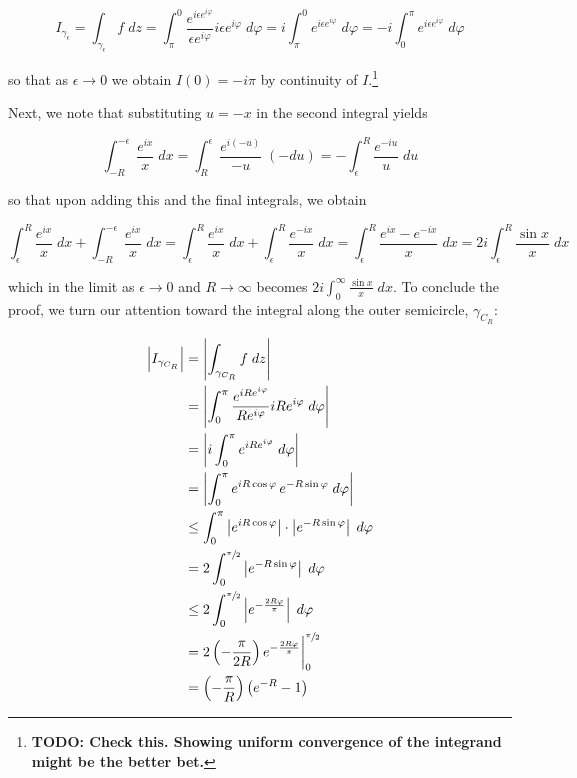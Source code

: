 \begin{solution}
    $$
    I_{\gamma_{\epsilon}} 
      = \int_{\gamma_{\epsilon}} {f \; dz } 
      = \int_{\pi}^{0} {\frac{e^{i \epsilon e^{i \varphi}}}{\epsilon e^{i \varphi}} i \epsilon e^{i \varphi} \; d\varphi }
      = i \int_{\pi}^{0} {e^{i \epsilon e^{i \varphi}} \; d\varphi }
      = -i \int_{0}^{\pi} {e^{i \epsilon e^{i \varphi}} \; d\varphi }
    $$

    so that as $\epsilon \to 0$ we obtain $I(0) = -i \pi$ by continuity of $I$.\footnote{
        \textbf{TODO: Check this. Showing uniform convergence of the integrand might be the better bet.}
    }

    \pagebreak
    Next, we note that substituting $u = -x$ in the second integral yields

    $$
    \int_{-R}^{-\epsilon} {\frac{e^{ix}}{x} \; dx} 
    = \int_{R}^{\epsilon} {\frac{e^{i(-u)}}{-u} \; (-du)}
    = -\int_{\epsilon}^{R} {\frac{e^{-iu}}{u} \; du}
    $$

    so that upon adding this and the final integrals, we obtain

    $$
    \int_{\epsilon}^{R} {\frac{e^{ix}}{x} \; dx} + \int_{-R}^{-\epsilon} {\frac{e^{ix}}{x} \; dx} 
    = \int_{\epsilon}^{R} {\frac{e^{ix}}{x} \; dx} + \int_{\epsilon}^{R} {\frac{e^{-ix}}{x} \; dx}
    = \int_{\epsilon}^{R} {\frac{e^{ix} - e^{-ix}}{x} \; dx}
    = 2i \int_{\epsilon}^{R} {\frac{\sin{x}}{x} \; dx}
    $$

    which in the limit as $\epsilon \to 0$ and $R \to \infty$ becomes $2i \int_{0}^{\infty} {\frac{\sin{x}}{x} \; dx}$.
    To conclude the proof, we turn our attention toward the integral along the outer semicircle, $\gamma_{C_R}$:

    \begin{align*}
    \left| I_{\gamma_{C_R}} \right|
      &= \left| \int_{\gamma_{C_R}} {f \; dz } \right| \\
      &= \left| \int_{0}^{\pi} {\frac{e^{i R e^{i \varphi}}}{R e^{i \varphi}} i R e^{i \varphi} \; d\varphi } \right| \\
      &= \left| i \int_{0}^{\pi} {e^{i R e^{i \varphi}} \; d\varphi } \right| \\
      &= \left| \int_{0}^{\pi} {e^{i R \cos{\varphi}} \, e^{-R \sin{\varphi}} \; d\varphi } \right| \\
      &\le \int_{0}^{\pi} {\left| e^{i R \cos{\varphi}}\right| \cdot \left| e^{-R \sin{\varphi}} \right| \; d\varphi } \\
      &=   2 \int_{0}^{\sfrac{\pi}{2}} {\left| e^{-R \sin{\varphi}} \right| \; d\varphi } \\
      &\le 2 \int_{0}^{\sfrac{\pi}{2}} {\left| e^{-\frac{2 R \varphi}{\pi} } \right| \; d\varphi } \\
      &=   2 \left( -\frac{\pi}{2 R} \right) e^{-\frac{2 R \varphi}{\pi}} \bigg|_0^{\sfrac{\pi}{2}} \\
      &=   \left( -\frac{\pi}{R} \right) \left( e^{-R} - 1 \right)
    \end{align*}


\end{solution}
